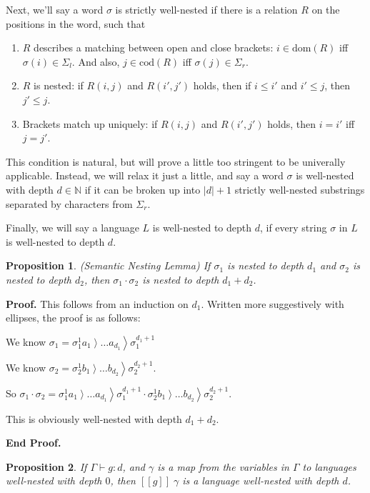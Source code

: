 \documentclass{article}
\newcommand{\rgt}[1]{\left.{#1}\right>}
\newcommand{\nats}{\mathbb{N}}
\newcommand{\judgebalance}[3][\Gamma]{{#1} \vdash {#2} : {#3}}
\newcommand{\interp}[1]{[\![{#1}]\!]}
\newtheorem{prop}{Proposition}
\newenvironment{proof}{\noindent\textbf{Proof.}}{\noindent\textbf{End Proof.}}
\begin{document}
Next, we'll say a word $\sigma$ is strictly well-nested if there is a
relation $R$ on the positions in the word, such that

\begin{enumerate}
\item $R$ describes a matching between open and close brackets: 
      $i \in \mathrm{dom}(R)$ iff $\sigma(i) \in \Sigma_l$. And also,
      $j \in \mathrm{cod}(R)$ iff $\sigma(j) \in \Sigma_r$.
\item $R$ is nested: if $R(i, j)$ and $R(i', j')$ holds, then if $i \leq i'$ and $i' \leq j$, then $j' \leq j$. 
\item Brackets match up uniquely: if $R(i, j)$ and $R(i', j')$ holds, then $i = i'$ iff $j = j'$. 
\end{enumerate}

This condition is natural, but will prove a little too stringent to be
univerally applicable. Instead, we will relax it just a little, and
say a word $\sigma$ is well-nested with depth $d \in \nats$ if it can
be broken up into $|d| + 1$ strictly well-nested substrings separated
by characters from $\Sigma_r$.

Finally, we will say a language $L$ is well-nested to depth $d$, if
every string $\sigma$ in $L$ is well-nested to depth $d$.

\begin{prop}{(Semantic Nesting Lemma)}
If $\sigma_1$ is nested to depth $d_1$ and $\sigma_2$ is nested to depth $d_2$, then 
$\sigma_1\cdot\sigma_2$ is nested to depth $d_1 + d_2$.
\end{prop}

\begin{proof}
  This follows from an induction on $d_1$. Written more suggestively with ellipses, 
the proof is as follows: 

  We know $\sigma_1 = \sigma^1_1\rgt{a_1}\ldots\rgt{a_{d_1}}\sigma^{d_1+1}_1$

  We know $\sigma_2 = \sigma^1_2\rgt{b_1}\ldots\rgt{b_{d_2}}\sigma^{d_2+1}_2$.
  
  So $\sigma_1\cdot\sigma_2 = \sigma^1_1\rgt{a_1}\ldots\rgt{a_{d_1}}\sigma^{d_1+1}_1\cdot\sigma^1_2\rgt{b_1}\ldots\rgt{b_{d_2}}\sigma^{d_2+1}_2$.

  This is obviously well-nested with depth $d_1 + d_2$. 

\end{proof}

\begin{prop}
If $\judgebalance{g}{d}$, and $\gamma$ is a map from the variables in $\Gamma$ to 
languages well-nested with depth $0$, then $\interp{g}\;\gamma$ is a language well-nested 
with depth $d$. 
\end{prop}
\end{document}
